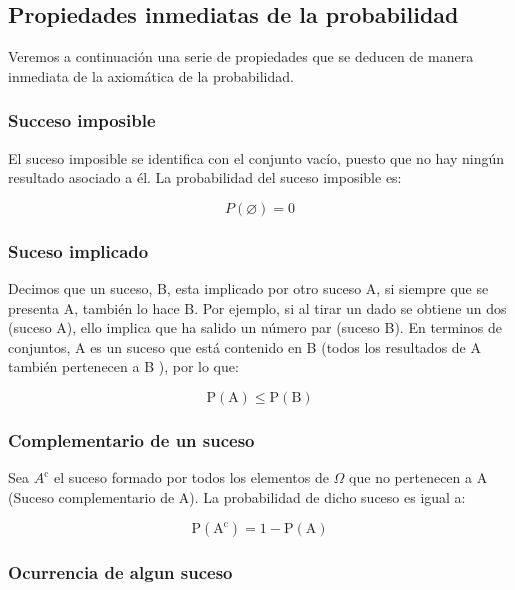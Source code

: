 \documentclass[
]{article}
\begin{document}
\subsection{Propiedades inmediatas de la probabilidad}\label{propiedades-inmediatas-de-la-probabilidad}

Veremos a continuación una serie de propiedades que se deducen de manera
inmediata de la axiomática de la probabilidad.

\subsubsection{Succeso imposible}\label{succeso-imposible}

El suceso imposible se identifica con el conjunto vacío, puesto que no hay ningún resultado asociado a él. La probabilidad del suceso imposible es:

\[
P(\varnothing)=0
\]

\subsubsection{Suceso implicado}\label{suceso-implicado}

Decimos que un suceso, B, esta implicado por otro suceso A, si siempre que se presenta A, también lo hace B. Por ejemplo, si al tirar un dado se obtiene un dos (suceso A), ello implica que ha salido un número par (suceso B). En terminos de conjuntos, A es un suceso que está contenido en B (todos los resultados de A
también pertenecen a B ), por lo que:

\[
\mathrm{P}(\mathrm{A}) \leq \mathrm{P}(\mathrm{B})
\]

\subsubsection{Complementario de un suceso}\label{complementario-de-un-suceso}

Sea \(A^{\mathrm{c}}\) el suceso formado por todos los elementos de
\(\Omega\) que no pertenecen a A (Suceso complementario de A). La
probabilidad de dicho suceso es igual a:

\[
\mathrm{P}\left(\mathrm{A}^{\mathrm{c}}\right)=1-\mathrm{P}(\mathrm{A})
\]

\subsubsection{Ocurrencia de algun suceso}\label{ocurrencia-de-algun-suceso}
\end{document}
